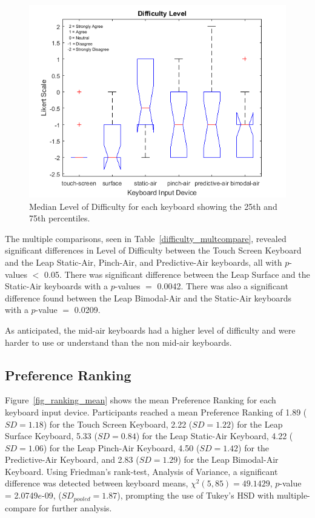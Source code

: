 \begin{figure}[h]
	\centering
	\includegraphics{fig_difficulty_boxplot}
	\caption[Level of Difficulty Boxplot]{Median Level of Difficulty for each keyboard showing the 25th and 75th percentiles.}
	\label{fig_difficulty_boxplot}
\end{figure}

The multiple comparisons, seen in Table~\ref{difficulty_multcompare}, revealed significant differences in Level of Difficulty between the Touch Screen Keyboard and the Leap Static-Air, Pinch-Air, and Predictive-Air keyboards, all with $p$-values $<$ 0.05. There was significant difference between the Leap Surface and the Static-Air keyboards with a $p$-values $=$ 0.0042. There was also a significant difference found between the Leap Bimodal-Air and the Static-Air keyboards with a $p$-value $=$ 0.0209.

As anticipated, the mid-air keyboards had a higher level of difficulty and were harder to use or understand than the non mid-air keyboards.

\subsection{Preference Ranking}
Figure~\ref{fig_ranking_mean} shows the mean Preference Ranking for each keyboard input device. Participants reached a mean Preference Ranking of 1.89 ($SD = 1.18$) for the Touch Screen Keyboard, 2.22 ($SD = 1.22$) for the Leap Surface Keyboard, 5.33 ($SD = 0.84$) for the Leap Static-Air Keyboard, 4.22 ($SD = 1.06$) for the Leap Pinch-Air Keyboard, 4.50 ($SD = 1.42$) for the Predictive-Air Keyboard, and 2.83 ($SD = 1.29$) for the Leap Bimodal-Air Keyboard. Using Friedman's rank-test, Analysis of Variance, a significant difference was detected between keyboard means, $\chi^{2}(5, 85) = 49.1429$, $p$-value = 2.0749$e$-09, ($SD_{pooled} = 1.87$), prompting the use of Tukey's HSD with multiple-compare for further analysis.

